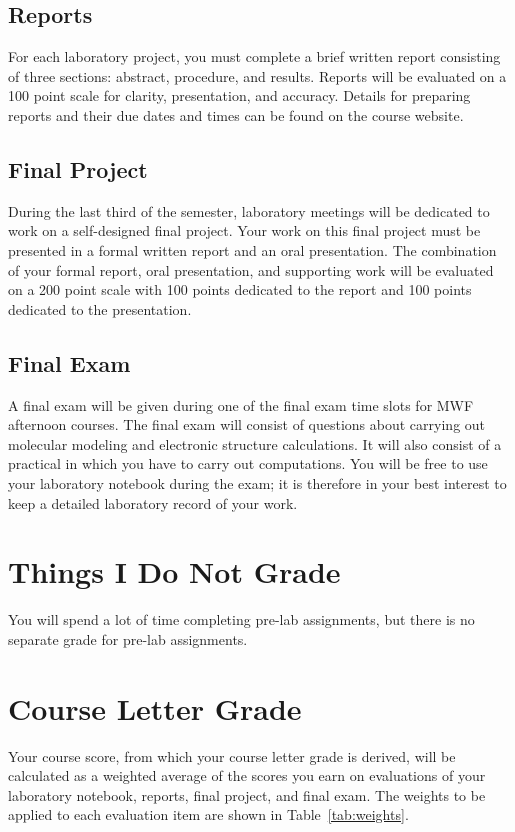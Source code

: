\documentclass[letterpaper,oneside,onecolumn,11pt,article]{memoir}
\begin{document}
\subsection{Reports}
For each laboratory project, you must complete a brief written report consisting of three sections: abstract, procedure, and results. Reports will be evaluated on a 100 point scale for clarity, presentation, and accuracy. Details for preparing reports and their due dates and times can be found on the course website.

\subsection{Final Project}
During the last third of the semester, laboratory meetings will be dedicated to work on a self-designed final project. Your work on this final project must be presented in a formal written report and an oral presentation. The combination of your formal report, oral presentation, and supporting work will be evaluated on a 200 point scale with 100 points dedicated to the report and 100 points dedicated to the presentation. 

\subsection{Final Exam}
A final exam will be given during one of the final exam time slots for MWF afternoon courses. The final exam will consist of questions about carrying out molecular modeling and electronic structure calculations. It will also consist of a practical in which you have to carry out computations. You will be free to use your laboratory notebook during the exam; it is therefore in your best interest to keep a detailed laboratory record of your work. 

\section{Things I Do Not Grade}
You will spend a lot of time completing pre-lab assignments, but there is no separate grade for pre-lab assignments. 

\section{Course Letter Grade}
Your course score, from which your course letter grade is derived, will be calculated as a weighted average of the scores you earn on evaluations of your laboratory notebook, reports, final project, and final exam. The weights to be applied to each evaluation item are shown in Table~\ref{tab:weights}.
\end{document}

